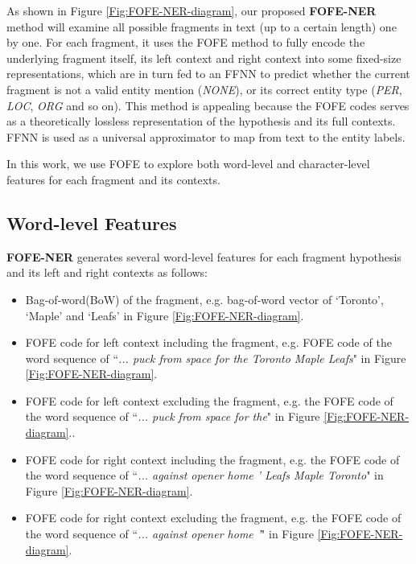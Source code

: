 \documentclass[11pt,a4paper]{article}
\begin{document}
As shown in Figure \ref{Fig:FOFE-NER-diagram}, our proposed \textbf{FOFE-NER} method will examine all possible fragments in text (up to a certain length) one by one. For each fragment, it uses the FOFE method to fully encode the underlying fragment itself, its left context and right context into some fixed-size representations, which are in turn fed to an FFNN to predict whether the current fragment is not a valid entity mention ({\it NONE}), or its correct entity type ({\it PER}, {\it LOC}, {\it ORG} and so on). This method is appealing because the FOFE codes serves as a theoretically lossless representation of the hypothesis and its full contexts. FFNN is used as a universal approximator to map from text to the entity labels. 


In this work, we use FOFE to explore both word-level and character-level features for each fragment and its contexts. 

\subsection{Word-level Features}

\textbf{FOFE-NER} generates several word-level features for each fragment hypothesis and its left and right contexts as follows:

\begin{itemize}
	\item Bag-of-word(BoW) of the fragment, e.g. bag-of-word vector of `Toronto', `Maple' and `Leafs' in Figure \ref{Fig:FOFE-NER-diagram}. 
	\item FOFE code for left context including the fragment, e.g. FOFE code of the word sequence of ``{\it ... puck from space for the Toronto Maple Leafs}" in Figure \ref{Fig:FOFE-NER-diagram}.
	\item FOFE code for left context excluding the fragment, e.g. the FOFE code of the word sequence of ``{\it ... puck from space for the}" in Figure \ref{Fig:FOFE-NER-diagram}..	
	\item FOFE code for right context including the fragment, e.g. the FOFE code of the word sequence of ``{\it   ... against opener home ' Leafs  Maple  Toronto}" in Figure \ref{Fig:FOFE-NER-diagram}.
	\item FOFE code for right context excluding the fragment, e.g. the FOFE code of the word sequence of ``{\it ... against opener home '}" in Figure \ref{Fig:FOFE-NER-diagram}.
\end{itemize}
\end{document}
